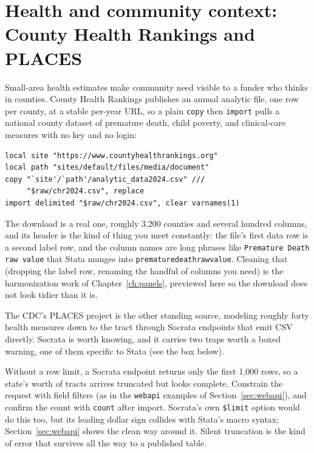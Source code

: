 \documentclass[
    a4paper,
    fontsize=10pt,
    twoside=true,
    numbers=noenddot,
]{kaobook}
\newenvironment{vizcallout}[1][Visualization to build]{%
    \begin{vizbox}[frametitle={#1}]%
}{%
    \end{vizbox}%
}
\begin{document}
\section{Health and community context: County Health Rankings and PLACES}
Small-area health estimates make community need visible to a funder who thinks in counties. County Health Rankings publishes an annual analytic file, one row per county, at a stable per-year URL, so a plain \texttt{copy} then \texttt{import} pulls a national county dataset of premature death, child poverty, and clinical-care measures with no key and no login:
{\footnotesize
\begin{verbatim}
local site "https://www.countyhealthrankings.org"
local path "sites/default/files/media/document"
copy "`site'/`path'/analytic_data2024.csv" ///
     "$raw/chr2024.csv", replace
import delimited "$raw/chr2024.csv", clear varnames(1)
\end{verbatim}
}
The download is a real one, roughly 3{,}200 counties and several hundred columns, and its header is the kind of thing you meet constantly: the file's first data row is a second label row, and the column names are long phrases like \texttt{Premature Death raw value} that Stata munges into \texttt{prematuredeathrawvalue}. Cleaning that (dropping the label row, renaming the handful of columns you need) is the harmonization work of Chapter~\ref{ch:panels}, previewed here so the download does not look tidier than it is.

The CDC's PLACES project is the other standing source, modeling roughly forty health measures down to the tract through Socrata endpoints that emit CSV directly. Socrata is worth knowing, and it carries two traps worth a boxed warning, one of them specific to Stata (see the box below).

\begin{vizcallout}[The Socrata truncation trap]
Without a row limit, a Socrata endpoint returns only the first 1{,}000 rows, so a state's worth of tracts arrives truncated but looks complete. Constrain the request with field filters (as in the \texttt{webapi} examples of Section~\ref{sec:webapi}), and confirm the count with \texttt{count} after import. Socrata's own \texttt{\$limit} option would do this too, but its leading dollar sign collides with Stata's macro syntax; Section~\ref{sec:webapi} shows the clean way around it. Silent truncation is the kind of error that survives all the way to a published table.
\end{vizcallout}
\end{document}
